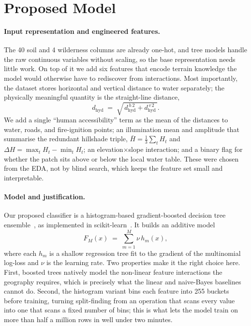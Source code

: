 \documentclass[sigconf,nonacm]{acmart}
\begin{document}
\section{Proposed Model}
\label{sec:model}
\paragraph{Input representation and engineered features.}
The 40 soil and 4 wilderness columns are already one-hot, and tree models handle
the raw continuous variables without scaling, so the base representation needs
little work. On top of it we add six features that encode terrain knowledge the
model would otherwise have to rediscover from interactions. Most importantly, the
dataset stores horizontal and vertical distance to water separately; the
physically meaningful quantity is the straight-line distance,
\begin{equation}
d_{\text{hyd}} \;=\; \sqrt{\,d_{\text{hyd}}^{\,h\,2} + d_{\text{hyd}}^{\,v\,2}\,}.
\end{equation}
We add a single ``human accessibility'' term as the mean of the distances to
water, roads, and fire-ignition points; an illumination mean and amplitude that
summarise the redundant hillshade triple,
$\bar{H}=\tfrac{1}{3}\sum_t H_t$ and
$\Delta H = \max_t H_t - \min_t H_t$; an elevation$\times$slope interaction; and
a binary flag for whether the patch sits above or below the local water table.
These were chosen from the EDA, not by blind search, which keeps the feature set
small and interpretable.

\paragraph{Model and justification.}
Our proposed classifier is a histogram-based gradient-boosted decision tree
ensemble~\cite{friedman2001,ke2017}, as implemented in
scikit-learn~\cite{pedregosa2011}. It builds an additive model
\begin{equation}
F_M(x) \;=\; \sum_{m=1}^{M}\nu\, h_m(x),
\end{equation}
where each $h_m$ is a shallow regression tree fit to the gradient of the
multinomial log-loss and $\nu$ is the learning rate. Two properties make it the
right choice here. First, boosted trees natively model the non-linear feature
interactions the geography requires, which is precisely what the linear and
naive-Bayes baselines cannot do. Second, the histogram variant bins each feature
into 255 buckets before training, turning split-finding from an operation that
scans every value into one that scans a fixed number of bins; this is what lets
the model train on more than half a million rows in well under two minutes.
\end{document}

